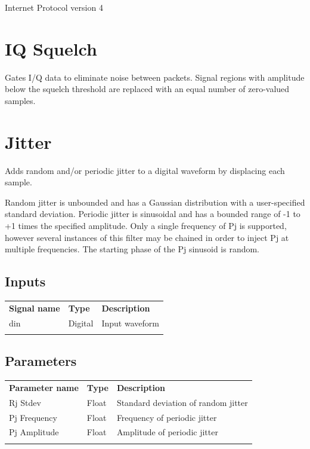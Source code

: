 Internet Protocol version 4

\pagebreak
\section{IQ Squelch}

Gates I/Q data to eliminate noise between packets. Signal regions with amplitude below the squelch threshold are
replaced with an equal number of zero-valued samples.

\pagebreak
\section{Jitter}
\label{filter:jitter}

Adds random and/or periodic jitter to a digital waveform by displacing each sample.

Random jitter is unbounded and has a Gaussian distribution with a user-specified standard deviation. Periodic jitter is
sinusoidal and has a bounded range of -1 to +1 times the specified amplitude. Only a single frequency of Pj is
supported, however several instances of this filter may be chained in order to inject Pj at multiple frequencies. The
starting phase of the Pj sinusoid is random.

\subsection{Inputs}

\begin{tabularx}{16cm}{llX}
\thickhline
\textbf{Signal name} & \textbf{Type} & \textbf{Description} \\
\thickhline
din & Digital & Input waveform\\
\thickhline
\end{tabularx}

\subsection{Parameters}

\begin{tabularx}{16cm}{llX}
\thickhline
\textbf{Parameter name} & \textbf{Type} & \textbf{Description} \\
\thickhline
Rj Stdev & Float & Standard deviation of random jitter\\
\thinhline
Pj Frequency & Float & Frequency of periodic jitter\\
\thinhline
Pj Amplitude & Float & Amplitude of periodic jitter\\
\thickhline
\end{tabularx}

